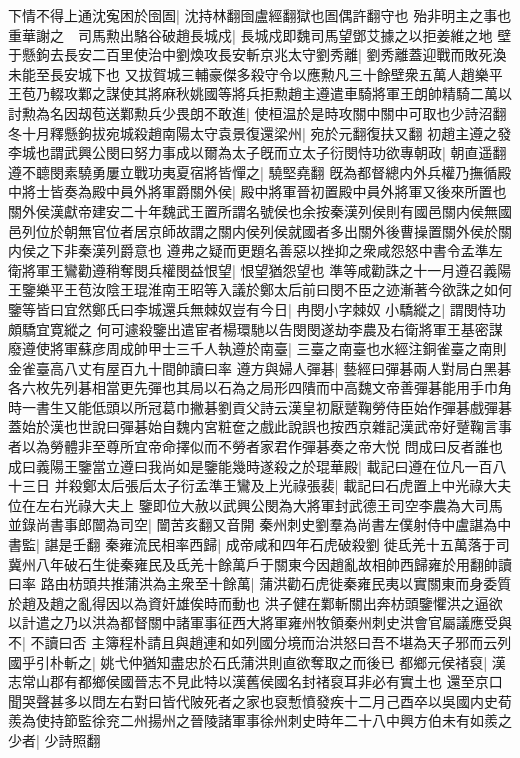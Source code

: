下情不得上通沈寃困於囹圄|{
	沈持林翻囹盧經翻獄也圄偶許翻守也}
殆非明主之事也重華謝之　司馬勲出駱谷破趙長城戍|{
	長城戍即魏司馬望鄧艾據之以拒姜維之地}
壁于懸鉤去長安二百里使治中劉煥攻長安斬京兆太守劉秀離|{
	劉秀離蓋迎戰而敗死渙未能至長安城下也}
又拔賀城三輔豪傑多殺守令以應勲凡三十餘壁衆五萬人趙樂平王苞乃輟攻鄴之謀使其將麻秋姚國等將兵拒勲趙主遵遣車騎將軍王朗帥精騎二萬以討勲為名因刼苞送鄴勲兵少畏朗不敢進|{
	使桓温於是時攻關中關中可取也少詩沼翻}
冬十月釋懸鉤拔宛城殺趙南陽太守袁景復還梁州|{
	宛於元翻復扶又翻}
初趙主遵之發李城也謂武興公閔曰努力事成以爾為太子旣而立太子衍閔恃功欲專朝政|{
	朝直遥翻}
遵不聼閔素驍勇屢立戰功夷夏宿將皆憚之|{
	驍堅堯翻}
旣為都督總内外兵權乃撫循殿中將士皆奏為殿中員外將軍爵關外侯|{
	殿中將軍晉初置殿中員外將軍又後來所置也關外侯漢獻帝建安二十年魏武王置所謂名號侯也余按秦漢列侯則有國邑關内侯無國邑列位於朝無官位者居京師故謂之關内侯列侯就國者多出關外後曹操置關外侯於關内侯之下非秦漢列爵意也}
遵弗之疑而更題名善惡以挫抑之衆咸怨怒中書令孟準左衛將軍王鸞勸遵稍奪閔兵權閔益恨望|{
	恨望猶怨望也}
準等咸勸誅之十一月遵召義陽王鑒樂平王苞汝陰王琨淮南王昭等入議於鄭太后前曰閔不臣之迹漸著今欲誅之如何鑒等皆曰宜然鄭氏曰李城還兵無棘奴豈有今日|{
	冉閔小字棘奴}
小驕縱之|{
	謂閔恃功頗驕宜寛縱之}
何可遽殺鑒出遣宦者楊環馳以告閔閔遂劫李農及右衛將軍王基密謀廢遵使將軍蘇彦周成帥甲士三千人執遵於南臺|{
	三臺之南臺也水經注銅雀臺之南則金雀臺高八丈有屋百九十間帥讀曰率}
遵方與婦人彈碁|{
	藝經曰彈碁兩人對局白黑碁各六枚先列碁相當更先彈也其局以石為之局形四隤而中高魏文帝善彈碁能用手巾角時一書生又能低頭以所冠葛巾撇碁劉貢父詩云漢皇初厭蹵鞠勞侍臣始作彈碁戲彈碁蓋始於漢也世說曰彈碁始自魏内宮粧奩之戲此說誤也按西京雜記漢武帝好蹵鞠言事者以為勞體非至尊所宜帝命擇似而不勞者家君作彈碁奏之帝大悦}
問成曰反者誰也成曰義陽王鑒當立遵曰我尚如是鑒能幾時遂殺之於琨華殿|{
	載記曰遵在位凡一百八十三日}
并殺鄭太后張后太子衍孟準王鸞及上光祿張裴|{
	載記曰石虎置上中光祿大夫位在左右光祿大夫上}
鑒即位大赦以武興公閔為大將軍封武德王司空李農為大司馬並錄尚書事郎闓為司空|{
	闓苦亥翻又音開}
秦州刺史劉羣為尚書左僕射侍中盧諶為中書監|{
	諶是壬翻}
秦雍流民相率西歸|{
	成帝咸和四年石虎破殺劉徙氐羌十五萬落于司冀州八年破石生徙秦雍民及氐羌十餘萬戶于關東今因趙亂故相帥西歸雍於用翻帥讀曰率}
路由枋頭共推蒲洪為主衆至十餘萬|{
	蒲洪勸石虎徙秦雍民夷以實關東而身委質於趙及趙之亂得因以為資奸雄俟時而動也}
洪子健在鄴斬關出奔枋頭鑒懼洪之逼欲以計遣之乃以洪為都督關中諸軍事征西大將軍雍州牧領秦州刺史洪會官屬議應受與不|{
	不讀曰否}
主簿程朴請且與趙連和如列國分境而治洪怒曰吾不堪為天子邪而云列國乎引朴斬之|{
	姚弋仲猶知盡忠於石氏蒲洪則直欲奪取之而後已}
都鄉元侯禇裒|{
	漢志常山郡有都鄉侯國晉志不見此特以漢舊侯國名封禇裒耳非必有實土也}
還至京口聞哭聲甚多以問左右對曰皆代陂死者之家也裒慙憤發疾十二月己酉卒以吳國内史荀羨為使持節監徐兖二州揚州之晉陵諸軍事徐州刺史時年二十八中興方伯未有如羨之少者|{
	少詩照翻}
